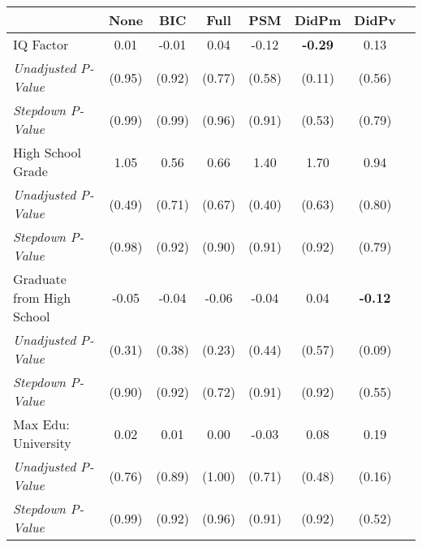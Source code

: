 \begin{tabular}{l c c c c c c c}
\toprule
 & None & BIC & Full & PSM & DidPm & DidPv \\
\midrule
IQ Factor & 0.01 & -0.01 & 0.04 & -0.12 & \textbf{ -0.29 } & 0.13 \\
\quad \textit{Unadjusted P-Value} & (0.95) & (0.92) & (0.77) & (0.58) & (0.11) & (0.56) \\
\quad \textit{Stepdown P-Value} & (0.99) & (0.99) & (0.96) & (0.91) & (0.53) & (0.79) \\
High School Grade & 1.05 & 0.56 & 0.66 & 1.40 & 1.70 & 0.94 \\
\quad \textit{Unadjusted P-Value} & (0.49) & (0.71) & (0.67) & (0.40) & (0.63) & (0.80) \\
\quad \textit{Stepdown P-Value} & (0.98) & (0.92) & (0.90) & (0.91) & (0.92) & (0.79) \\
Graduate from High School & -0.05 & -0.04 & -0.06 & -0.04 & 0.04 & \textbf{ -0.12 } \\
\quad \textit{Unadjusted P-Value} & (0.31) & (0.38) & (0.23) & (0.44) & (0.57) & (0.09) \\
\quad \textit{Stepdown P-Value} & (0.90) & (0.92) & (0.72) & (0.91) & (0.92) & (0.55) \\
Max Edu: University & 0.02 & 0.01 & 0.00 & -0.03 & 0.08 & 0.19 \\
\quad \textit{Unadjusted P-Value} & (0.76) & (0.89) & (1.00) & (0.71) & (0.48) & (0.16) \\
\quad \textit{Stepdown P-Value} & (0.99) & (0.92) & (0.96) & (0.91) & (0.92) & (0.52) \\
\bottomrule
\end{tabular}
